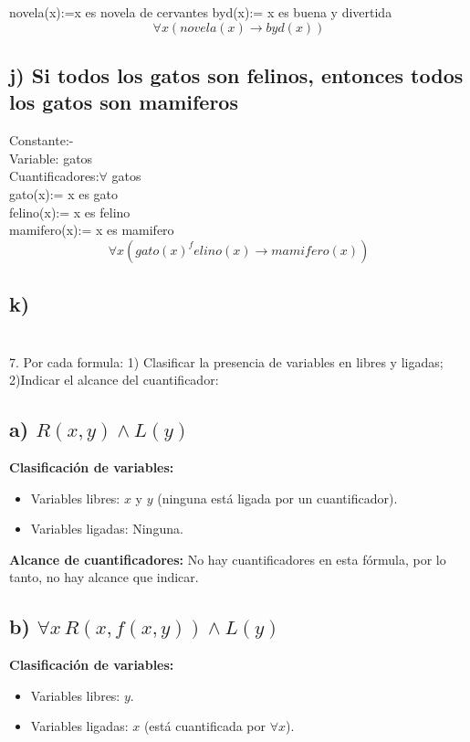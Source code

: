 \documentclass[11pt,letterpaper]{article}
\begin{document}
novela(x):=x es novela de cervantes
byd(x):= x es buena y divertida
$$\forall x (novela(x) \rightarrow byd(x))$$
\subsection*{j) Si todos los gatos son felinos, entonces todos los gatos son mamiferos}
Constante:- \\
Variable: gatos\\
Cuantificadores:$\forall $ gatos\\

gato(x):= x es gato\\
felino(x):= x es felino\\
mamifero(x):= x es mamifero\\
$$\forall x(gato(x)^felino(x) \rightarrow mamifero(x))$$
\subsection*{k) }


\section{}7. Por cada formula: 1) Clasificar la presencia de variables en libres y ligadas; 2)Indicar el alcance del cuantificador:

\subsection*{a) \( R(x, y) \land L(y) \)}

\textbf{Clasificación de variables:}
\begin{itemize}
    \item Variables libres: \( x \) y \( y \) (ninguna está ligada por un cuantificador).
    \item Variables ligadas: Ninguna.
\end{itemize}

\textbf{Alcance de cuantificadores:} No hay cuantificadores en esta fórmula, por lo tanto, no hay alcance que indicar.

\subsection*{b) \( \forall x \, R(x, f(x, y)) \land L(y) \)}

\textbf{Clasificación de variables:}
\begin{itemize}
    \item Variables libres: \( y \).
    \item Variables ligadas: \( x \) (está cuantificada por \( \forall x \)).
\end{itemize}
\end{document}
